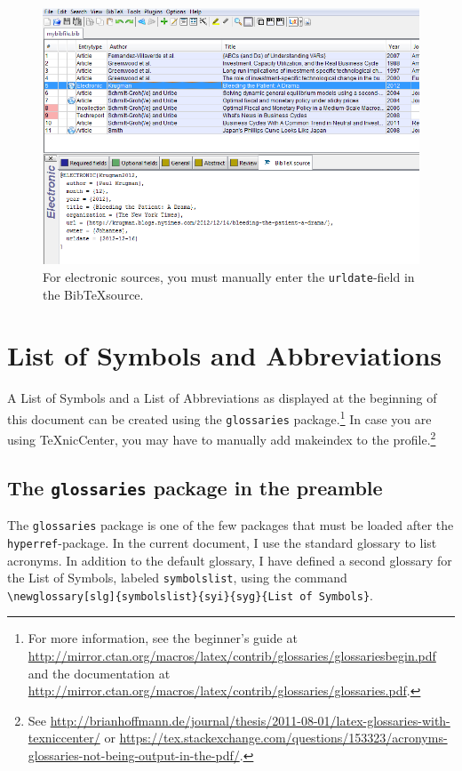 \documentclass[a4paper,12pt]{scrartcl} %
\makeatletter
\def\ScaleIfNeeded{%
\ifdim\Gin@nat@width>\linewidth
\linewidth
\else
\Gin@nat@width
\fi
}
\makeatother
\begin{document}
\begin{figure}[htbp!]
\includegraphics[width=\ScaleIfNeeded]{Urldate}
\caption[Adding electronic sources]{For electronic sources, you must manually enter the \texttt{urldate}-field in the Bib\TeX source.}\label{fig:jabref_urldate}
\end{figure}


\section{List of Symbols and Abbreviations}
A List of Symbols and a List of Abbreviations as displayed at the beginning of this document can be created using the \texttt{glossaries} package.\footnote{For more information, see the beginner's guide at \url{http://mirror.ctan.org/macros/latex/contrib/glossaries/glossariesbegin.pdf} and the documentation at \url{http://mirror.ctan.org/macros/latex/contrib/glossaries/glossaries.pdf}.} In case you are using TeXnicCenter, you may have to manually add makeindex to the profile.\footnote{See \url{http://brianhoffmann.de/journal/thesis/2011-08-01/latex-glossaries-with-texniccenter/} or \url{https://tex.stackexchange.com/questions/153323/acronyms-glossaries-not-being-output-in-the-pdf/}.}

\subsection{The \texttt{glossaries} package in the preamble}
The \texttt{glossaries} package is one of the few packages that must be loaded after the \texttt{hyperref}-package. In the current document, I use the standard glossary to list acronyms. In addition to the default glossary, I have defined a second glossary for the List of Symbols, labeled \texttt{symbolslist}, using the command\\
\verb|\newglossary[slg]{symbolslist}{syi}{syg}{List of Symbols}|.\\
\end{document}
